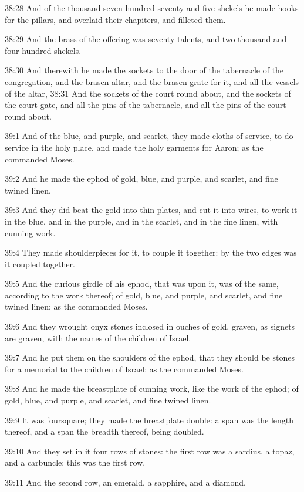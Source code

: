 38:28 And of the thousand seven hundred seventy and five shekels he
made hooks for the pillars, and overlaid their chapiters, and filleted
them.

38:29 And the brass of the offering was seventy talents, and two
thousand and four hundred shekels.

38:30 And therewith he made the sockets to the door of the tabernacle
of the congregation, and the brasen altar, and the brasen grate for
it, and all the vessels of the altar, 38:31 And the sockets of the
court round about, and the sockets of the court gate, and all the pins
of the tabernacle, and all the pins of the court round about.

39:1 And of the blue, and purple, and scarlet, they made cloths of
service, to do service in the holy place, and made the holy garments
for Aaron; as the \LORD commanded Moses.

39:2 And he made the ephod of gold, blue, and purple, and scarlet, and
fine twined linen.

39:3 And they did beat the gold into thin plates, and cut it into
wires, to work it in the blue, and in the purple, and in the scarlet,
and in the fine linen, with cunning work.

39:4 They made shoulderpieces for it, to couple it together: by the
two edges was it coupled together.

39:5 And the curious girdle of his ephod, that was upon it, was of the
same, according to the work thereof; of gold, blue, and purple, and
scarlet, and fine twined linen; as the \LORD commanded Moses.

39:6 And they wrought onyx stones inclosed in ouches of gold, graven,
as signets are graven, with the names of the children of Israel.

39:7 And he put them on the shoulders of the ephod, that they should
be stones for a memorial to the children of Israel; as the \LORD
commanded Moses.

39:8 And he made the breastplate of cunning work, like the work of the
ephod; of gold, blue, and purple, and scarlet, and fine twined linen.

39:9 It was foursquare; they made the breastplate double: a span was
the length thereof, and a span the breadth thereof, being doubled.

39:10 And they set in it four rows of stones: the first row was a
sardius, a topaz, and a carbuncle: this was the first row.

39:11 And the second row, an emerald, a sapphire, and a diamond.

